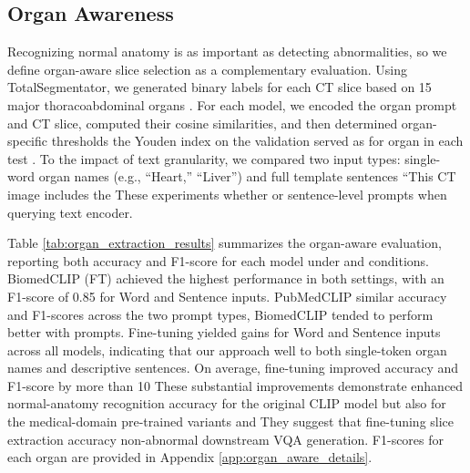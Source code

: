 \documentclass[bioengineering,article,submit,pdftex,moreauthors]{Definitions/mdpi}
\begin{document}
\subsection{Organ Awareness}\label{sec:organ_aware}
Recognizing normal anatomy is as important as detecting abnormalities, so we deﬁne organ-aware slice selection as a complementary evaluation. 
Using TotalSegmentator, we generated binary  labels for each CT slice based on 15 major thoracoabdominal organs \cite{wasserthal_totalsegmentator_2023}. 
For each model, we encoded the organ prompt and  CT slice, computed their cosine similarities, and then determined organ-specific thresholds  the Youden index on the validation   served as  for  organ  in each test  \cite{youden_index_1950}. 
To  the impact of text granularity, we compared two input types: single-word organ names (e.g., “Heart,” “Liver”) and full template sentences  “This CT image includes the These experiments  whether  or sentence-level prompts when querying  text encoder. 


Table \ref{tab:organ_extraction_results} summarizes the organ-aware evaluation, reporting both accuracy and F1-score for each model under  and  conditions. 
BiomedCLIP (FT) achieved the highest performance in both settings, with an F1-score of 0.85 for Word and Sentence inputs. 
PubMedCLIP  similar accuracy and F1-scores across the two prompt types,  BiomedCLIP tended to perform better with  prompts. 
Fine-tuning yielded  gains for Word and Sentence inputs across all models, indicating that our approach  well to both single-token organ names and  descriptive sentences. 
On average, fine-tuning improved accuracy and F1-score by more than 10%
These substantial improvements demonstrate enhanced normal-anatomy recognition accuracy for the original CLIP model but also for the medical-domain pre-trained variants  and  
They suggest that fine-tuning  slice extraction accuracy  non-abnormal    downstream VQA generation.
F1-scores for each organ are provided in Appendix \ref{app:organ_aware_details}.
\end{document}
